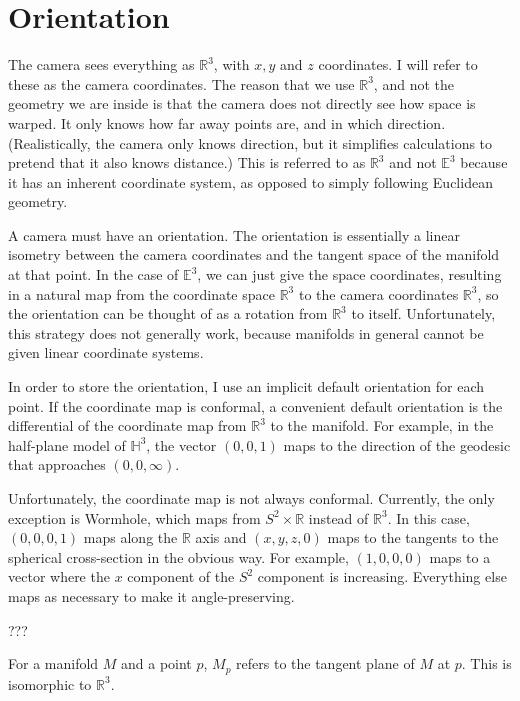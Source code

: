 \section{Orientation}


The camera sees everything as $\mathbb{R}^3$, with $x,y$ and $z$ coordinates. I will refer to these as the camera coordinates. The reason that we use $\mathbb{R}^3$, and not the geometry we are inside is that the camera does not directly see how space is warped. It only knows how far away points are, and in which direction. (Realistically, the camera only knows direction, but it simplifies calculations to pretend that it also knows distance.) This is referred to as $\mathbb{R}^3$ and not $\mathbb{E}^3$ because it has an inherent coordinate system, as opposed to simply following Euclidean geometry.

A camera must have an orientation. The orientation is essentially a linear isometry between the camera coordinates and the tangent space of the manifold at that point. In the case of $\mathbb{E}^3$, we can just give the space coordinates, resulting in a natural map from the coordinate space $\mathbb{R}^3$ to the camera coordinates $\mathbb{R}^3$, so the orientation can be thought of as a rotation from $\mathbb{R}^3$ to itself. Unfortunately, this strategy does not generally work, because manifolds in general cannot be given linear coordinate systems.

In order to store the orientation, I use an implicit default orientation for each point. If the coordinate map is conformal, a convenient default orientation is the differential of the coordinate map from $\mathbb{R}^3$ to the manifold. For example, in the half-plane model of $\mathbb{H}^3$, the vector $(0,0,1)$ maps to the direction of the geodesic that approaches $(0,0,\infty)$.

Unfortunately, the coordinate map is not always conformal. Currently, the only exception is Wormhole, which maps from $S^2 \times \mathbb{R}$ instead of $\mathbb{R}^3$. In this case, $(0,0,0,1)$ maps along the $\mathbb{R}$ axis and $(x,y,z,0)$ maps to the tangents to the spherical cross-section in the obvious way. For example, $(1,0,0,0)$ maps to a vector where the $x$ component of the $S^2$ component is increasing. Everything else maps as necessary to make it angle-preserving.

???

For a manifold $M$ and a point $p$, $M_p$ refers to the tangent plane of $M$ at $p$. This is isomorphic to $\mathbb{R}^3$.

